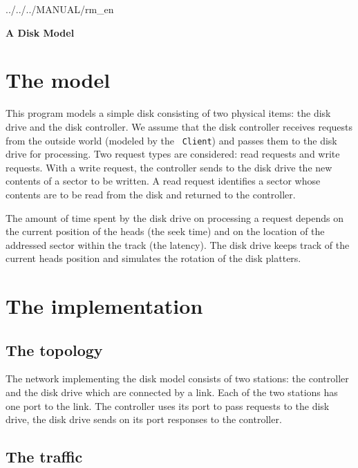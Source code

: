  {../../../MANUAL/rm_en}



\begin{titlepage}

\vspace*{3.5in}
\begin{center}
\Huge\bf A Disk Model \vspace{0.25in}
\end{center}
\end{titlepage}

\section{The model}

This program models a simple disk consisting of two physical items:
the disk drive and the disk controller.
We assume that the disk controller receives requests from the outside world
(modeled by the \smurph\ {\tt Client})
and passes them to the disk drive for processing.
Two request types are considered: read requests and write requests.
With a write request, the controller sends to the disk drive the new contents
of a sector to be written.
A read request identifies a sector whose contents are to be read from the
disk and returned to the controller.

The amount of time spent by the disk drive on processing a request depends
on the current position of the heads (the seek time) and on the location
of the addressed sector within the track (the latency).
The disk drive keeps track of the current heads position and simulates the
rotation of the disk platters.

\section{The implementation}

\subsection{The topology}

The network implementing the disk model consists of two stations:
the controller and the disk drive which are connected by a link.
Each of the two stations has one port to the link.
The controller uses its port to pass requests to the disk drive,
the disk drive sends on its port responses to the controller.

\subsection{The traffic}


